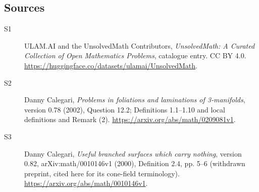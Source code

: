 \documentclass[11pt]{article}
\begin{document}
\subsection{Sources}
\begin{description}
\item[\hypertarget{source:statement:1}{S1}] ULAM.AI and the UnsolvedMath Contributors, \emph{UnsolvedMath: A Curated Collection of Open Mathematics Problems}, catalogue entry. CC BY 4.0. \url{https://huggingface.co/datasets/ulamai/UnsolvedMath}.
\item[\hypertarget{source:statement:2}{S2}] Danny Calegari, \emph{Problems in foliations and laminations of 3-manifolds}, version 0.78 (2002), Question 12.2; Definitions 1.1--1.10 and local definitions and Remark (2). \url{https://arxiv.org/abs/math/0209081v1}.
\item[\hypertarget{source:statement:3}{S3}] Danny Calegari, \emph{Useful branched surfaces which carry nothing}, version 0.82, arXiv:math/0010146v1 (2000), Definition 2.4, pp. 5--6 (withdrawn preprint, cited here for its cone-field terminology). \url{https://arxiv.org/abs/math/0010146v1}.
\end{description}
\label{end:statement}
\end{document}
